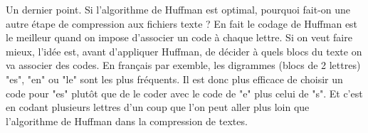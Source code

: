 \documentclass[a4paper,10pt]{article}
\begin{document}
Un dernier point. Si l'algorithme de Huffman est optimal, pourquoi
fait-on une autre étape de compression aux fichiers texte ? En fait le
codage de Huffman est le meilleur quand on impose d'associer un code à
chaque lettre. Si on veut faire mieux, l'idée est, avant d'appliquer
Huffman, de décider à quels blocs du texte on va associer des
codes. En français par exemble, les digrammes (blocs de 2 lettres)
"es", "en" ou "le" sont les plus fréquents. Il est donc plus efficace
de choisir un code pour "es" plutôt que de le coder avec le code de "e"
plus celui de "s". Et c'est en codant plusieurs lettres d'un coup que
l'on peut aller plus loin que l'algorithme de Huffman dans la
compression de textes.
\newpage
\thispagestyle{empty}
\hspace*{-1.5cm}
\end{document}
